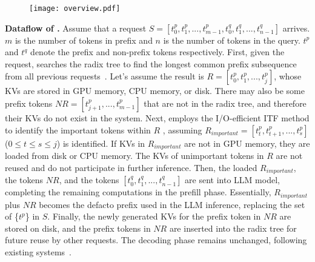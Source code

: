 
\begin{figure}
	\centering
	\texttt{[image: overview.pdf]}
	\caption{}
	\label{fig:overview}
	\vspace{-0.2in}
\end{figure}


\noindent \textbf{Dataflow of \pname{}.} 
Assume that a request $S=[t^p_0, t^p_1,...,t^p_{m-1}, t^q_0, t^q_1,...,t^q_{n-1}]$ arrives.
$m$ is the number of tokens in prefix and $n$ is the number of tokens in the query.
$t^p$ and $t^q$ denote the prefix and non-prefix tokens respectively. 
First, given the request, \pname{} searches the radix tree to find the longest common 
prefix subsequence from all previous requests~\cite{sglang-arxiv23, chunkattention-arxiv24}. 
Let's assume the result is  
$R=[t^p_0, t^p_1, ..., t^p_j]$, whose KVs are
stored in GPU memory, CPU memory, or disk.
There may also be some prefix tokens \( NR = [t^p_{j+1}, ..., t^p_{m-1}] \) that are not in the radix tree, and therefore their KVs do not exist in the system.
Next, \pname{} employs the I/O-efficient ITF method to identify 
the important tokens within $R$ , assuming $R_{important}=[t^p_{t}, t^p_{t+1}, ..., t^p_s]$ 
($ 0 \leq t \leq s \leq j$) is identified.
If KVs in $R_{important}$ are not in GPU memory, they are loaded from disk or CPU memory. 
The KVs of unimportant tokens in $R$ are not reused and do not participate in further inference.
Then, the loaded $R_{important}$, the tokens $NR$, and the tokens $[t^q_0, t^q_1,...,t^q_{n-1}]$   
are sent into LLM model, completing the remaining computations in the prefill phase.
Essentially, $R_{important}$ plus $NR$ becomes the defacto prefix used in the LLM inference,
replacing the set of \{$t^p$\} in $S$.
Finally, the newly generated KVs for the prefix token in $NR$ are stored on disk, 
and the prefix tokens in $NR$ are inserted into the radix tree for future reuse by other requests. 
The decoding phase remains unchanged, following existing systems~\cite{alluneed-nips17}.

